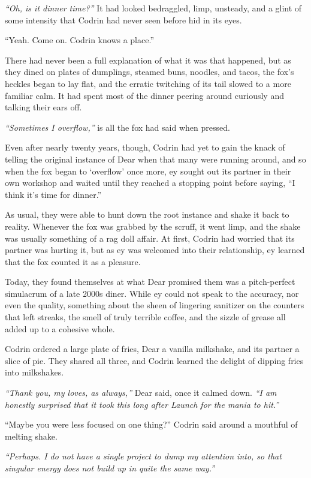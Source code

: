 \emph{``Oh, is it dinner time?''} It had looked bedraggled, limp, unsteady, and a glint of some intensity that Codrin had never seen before hid in its eyes.

``Yeah. Come on. Codrin knows a place.''

There had never been a full explanation of what it was that happened, but as they dined on plates of dumplings, steamed buns, noodles, and tacos, the fox's heckles began to lay flat, and the erratic twitching of its tail slowed to a more familiar calm. It had spent most of the dinner peering around curiously and talking their ears off.

\emph{``Sometimes I overflow,''} is all the fox had said when pressed.

Even after nearly twenty years, though, Codrin had yet to gain the knack of telling the original instance of Dear when that many were running around, and so when the fox began to `overflow' once more, ey sought out its partner in their own workshop and waited until they reached a stopping point before saying, ``I think it's time for dinner.''

As usual, they were able to hunt down the root instance and shake it back to reality. Whenever the fox was grabbed by the scruff, it went limp, and the shake was usually something of a rag doll affair. At first, Codrin had worried that its partner was hurting it, but as ey was welcomed into their relationship, ey learned that the fox counted it as a pleasure.

Today, they found themselves at what Dear promised them was a pitch-perfect simulacrum of a late 2000s diner. While ey could not speak to the accuracy, nor even the quality, something about the sheen of lingering sanitizer on the counters that left streaks, the smell of truly terrible coffee, and the sizzle of grease all added up to a cohesive whole.

Codrin ordered a large plate of fries, Dear a vanilla milkshake, and its partner a slice of pie. They shared all three, and Codrin learned the delight of dipping fries into milkshakes.

\emph{``Thank you, my loves, as always,''} Dear said, once it calmed down. \emph{``I am honestly surprised that it took this long after Launch for the mania to hit.''}

``Maybe you were less focused on one thing?'' Codrin said around a mouthful of melting shake.

\emph{``Perhaps. I do not have a single project to dump my attention into, so that singular energy does not build up in quite the same way.''}

